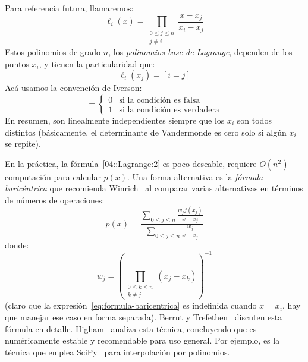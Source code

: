   Para referencia futura,
  llamaremos:
  \begin{equation}
    \label{eq:Lagrange-bases}
    \ell_i(x)
      = \prod_{\substack{0 \le j \le n \\ j \ne i}}
            \frac{x - x_j}{x_i - x_j}
  \end{equation}
  Estos polinomios de grado \(n\),
  los \emph{polinomios base de Lagrange},
  dependen de los puntos \(x_i\),
  y tienen la particularidad que:
  \begin{equation*}
    \ell_i(x_j)
      = [i = j]
  \end{equation*}
  Acá usamos la convención de Iverson:
  \begin{equation*}
    [\text{condición}]
      = \begin{cases}
          0 & \text{si la condición es falsa} \\
          1 & \text{si la condición es verdadera}
        \end{cases}
  \end{equation*}
  En resumen,
  son linealmente independientes siempre que los \(x_i\) son todos distintos
  (básicamente,
   el determinante de Vandermonde es cero solo si algún \(x_i\) se repite).

  En la práctica,
  la fórmula~\eqref{04::Lagrange:2} es poco deseable,
  requiere \(O(n^2)\) computación para calcular \(p(x)\).
  Una forma alternativa es la \emph{fórmula baricéntrica}
  que recomienda Winrich~%
    \cite{winrich69:_compar_evaluat_schem_interp_polyn}
  al comparar varias alternativas en términos de números de operaciones:
  \begin{equation}
    \label{eq:formula-baricentrica}
    p(x)
      = \frac{\sum_{0 \le j \le n} \frac{w_j f(x_j)}{x - x_j}}
             {\sum_{0 \le j \le n} \frac{w_j}{x - x_j}}
  \end{equation}
  donde:
  \begin{equation}
    \label{eq:wj-Lagrange}
    w_j
      = \left(
          \prod_{\substack{0 \le k \le n \\ k \ne j}} (x_j -x_k)
        \right)^{-1}
  \end{equation}
  (claro que la expresión~\eqref{eq:formula-baricentrica}
   es indefinida cuando \(x = x_i\),
   hay que manejar ese caso en forma separada).
  Berrut y Trefethen~%
    \cite{berrut04:_bary_lagrange_interp} discuten esta fórmula en detalle.
  Higham~%
    \cite{higham04:_numer_stab_baryc_lagrange_interp}
  analiza esta técnica,
  concluyendo que es numéricamente estable
  y recomendable para uso general.
  Por ejemplo,
  es la técnica que emplea SciPy~%
    \cite{2020SciPy-NMeth}
  para interpolación por polinomios.

